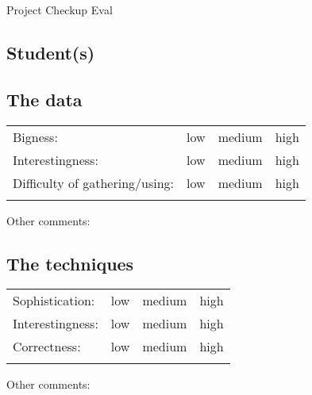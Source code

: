\documentclass[10pt]{article}
\theoremstyle{definition}
\begin{document}
\begin{center}
    {
\Large
Project Checkup Eval
}

\end{center}

\subsection*{Student(s)}

\vspace{0.5in}

\subsection*{The data}

\def\arraystretch{1.5}
\begin{tabular}{lccc}
    Bigness: & low & medium & high \\
    Interestingness: & low & medium & high \\
    Difficulty of gathering/using: & low & medium & high \\
    \hspace{2in} &
    \hspace{1in} &
    \hspace{1in} &
    \hspace{1in}
\end{tabular}

\noindent
Other comments:

\vspace{1in}

\subsection*{The techniques}

\def\arraystretch{1.5}
\begin{tabular}{lccc}
    Sophistication: & low & medium & high \\
    Interestingness: & low & medium & high \\
    Correctness: & low & medium & high \\
    \hspace{2in} &
    \hspace{1in} &
    \hspace{1in} &
    \hspace{1in}
\end{tabular}

\noindent
Other comments:

\vspace{1in}
\end{document}
